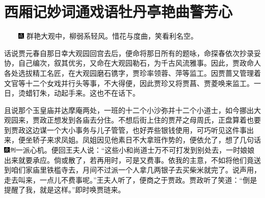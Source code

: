 

\chapter{西厢记妙词通戏语\hspace{.5em}牡丹亭艳曲警芳心}
{　　\includegraphics[width=3mm]{../Images/00005}  \kaishu 群艳大观中，柳弱系轻风。惜花与度曲，笑看利名空。}

话说贾元春自那日幸大观园回宫去后，便命将那日所有的题咏，命探春依次抄录妥协，自己编次，叙其优劣，又命在大观园勒石，为千古风流雅事。因此，贾政命人各处选拔精工名匠，在大观园磨石镌字，贾珍率领蓉、萍等监工。因贾蔷又管理着文官等十二个女戏并行头等事，不大得便，因此贾珍又将贾菖、贾菱唤来监工。一日，烫蜡钉朱，动起手来。这也不在话下。

且说那个玉皇庙并达摩庵两处，一班的十二个小沙弥并十二个小道士，如今挪出大观园来，贾政正想发到各庙去分住。不想后街上住的贾芹之母周氏，正盘算着也要到贾政这边谋一个大小事务与儿子管管，也好弄些银钱使用，可巧听见这件事出来，便坐轿子来求凤姐。凤姐因见他素日不大拿班作势的，便依允了，想了几句话{\includegraphics[width=3mm]{../Images/00004}\includegraphics[width=3mm]{../Images/00011}\footnotesize \kaishu 一派心机。}便回王夫人说：``这些小和尚道士万不可打发到别处去，一时娘娘出来就要承应。倘或散了，若再用时，可是又费事。依我的主意，不如将他们竟送到咱们家庙里铁槛寺去，月间不过派一个人拿几两银子去买柴米就完了。说声用，走去叫来，一点儿不费事呢。''王夫人听了，便商之于贾政。贾政听了笑道：``倒是提醒了我，就是这样。''即时唤贾琏来。

